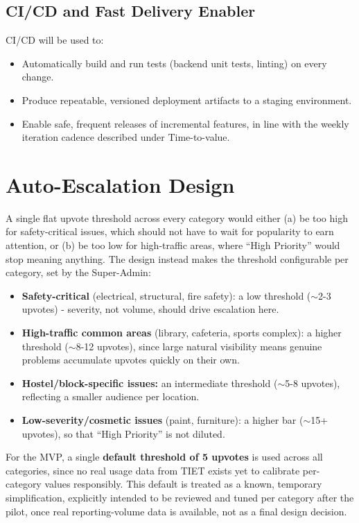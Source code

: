 \documentclass[11pt,a4paper]{article}
\begin{document}
\subsection{CI/CD and Fast Delivery Enabler}
CI/CD will be used to:
\begin{itemize}[leftmargin=0.7cm]
  \item Automatically build and run tests (backend unit tests, linting)
    on every change.
  \item Produce repeatable, versioned deployment artifacts to a staging
    environment.
  \item Enable safe, frequent releases of incremental features, in line
    with the weekly iteration cadence described under Time-to-value.
\end{itemize}


\section{Auto-Escalation Design}
\label{sec:auto-escalation}

A single flat upvote threshold across every category would either
(a) be too high for safety-critical issues, which should not have to
wait for popularity to earn attention, or (b) be too low for
high-traffic areas, where ``High Priority'' would stop meaning anything.
The design instead makes the threshold configurable per category, set by
the Super-Admin:

\begin{itemize}[leftmargin=0.7cm]
  \item \textbf{Safety-critical} (electrical, structural, fire safety):
    a low threshold ($\sim$2-3 upvotes) - severity, not volume, should
    drive escalation here.
  \item \textbf{High-traffic common areas} (library, cafeteria, sports
    complex): a higher threshold ($\sim$8-12 upvotes), since large
    natural visibility means genuine problems accumulate upvotes
    quickly on their own.
  \item \textbf{Hostel/block-specific issues:} an intermediate threshold
    ($\sim$5-8 upvotes), reflecting a smaller audience per location.
  \item \textbf{Low-severity/cosmetic issues} (paint, furniture): a
    higher bar ($\sim$15+ upvotes), so that ``High Priority'' is not
    diluted.
\end{itemize}

For the MVP, a single \textbf{default threshold of 5 upvotes} is used
across all categories, since no real usage data from TIET exists yet to
calibrate per-category values responsibly. This default is treated as a
known, temporary simplification, explicitly intended to be reviewed and
tuned per category after the pilot, once real reporting-volume data is
available, not as a final design decision.
\end{document}

